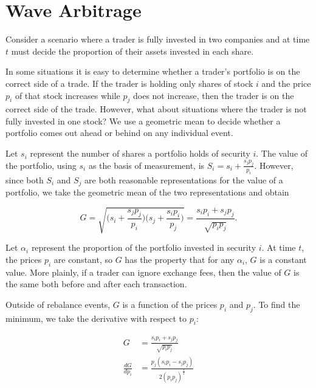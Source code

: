 \documentclass{article}
\begin{document}
\section{Wave Arbitrage}

Consider a scenario where a trader is fully invested in two companies and at
time $t$ must decide the proportion of their assets invested in each share.

In some situations it is easy to determine whether a trader’s portfolio is on
the correct side of a trade. If the trader is holding only shares of stock $i$
and the price $p_i$ of that stock increases while $p_j$ does not increase, then
the trader is on the correct side of the trade. However, what about situations
where the trader is not fully invested in one stock? We use a geometric mean to
decide whether a portfolio comes out ahead or behind on any individual event.

Let $s_i$ represent the number of shares a portfolio holds of security $i$. The
value of the portfolio, using $s_i$ as the basis of measurement, is
$S_i = s_i + \frac{s_j p_j}{p_i}$. However, since both $S_i$ and $S_j$ are both
reasonable representations for the value of a portfolio, we take the geometric
mean of the two representations and obtain

\begin{equation}
\label{eq:g_def}
  G = \sqrt{ \bigg( s_i + \frac{s_j p_j}{p_i} \bigg)
             \bigg( s_j + \frac{s_i p_i}{p_j} \bigg)
           }
    = \frac{s_i p_i + s_j p_j}{\sqrt{p_i p_j}}.
\end{equation}

Let $\alpha_i$ represent the proportion of the portfolio invested in security
$i$. At time $t$, the prices $p_i$ are constant, so $G$ has the property that
for any $\alpha_i$, $G$ is a constant value. More plainly, if a trader can
ignore exchange fees, then the value of $G$ is the same both before and after
each transaction.

Outside of rebalance events, $G$ is a function of the prices $p_i$ and $p_j$.
To find the minimum, we take the derivative with respect to $p_i$:

\begin{equation}
\begin{aligned}
  G &= \frac{s_i p_i + s_j p_j}{\sqrt{p_i p_j}} \\
  \frac{dG}{dp_i} &= \frac{p_j (s_i p_i - s_j p_j)}{2 (p_i p_j)^{\frac{3}{2}}} \\
\end{aligned}
\end{equation}
\end{document}
